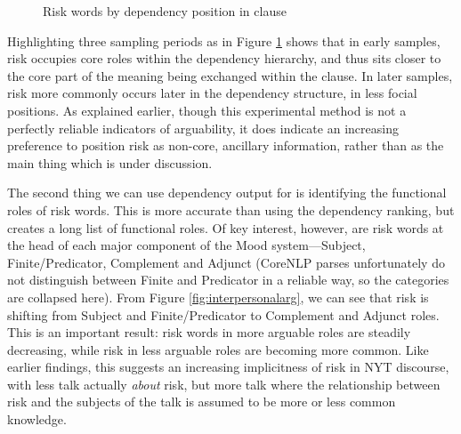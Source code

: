 			\begin{figure}[htb!]
			\centering
			\caption{Risk words by dependency position in clause}
			\label{fig:depnum}
			\end{figure}
			Highlighting three sampling periods as in Figure \ref{fig:depnum} shows that in early samples, risk occupies core roles within the dependency hierarchy, and thus sits closer to the core part of the meaning being exchanged within the clause. In later samples, risk more commonly occurs later in the dependency structure, in less focial positions. As explained earlier, though this experimental method is not a perfectly reliable indicators of arguability, it does indicate an increasing preference to position risk as non-core, ancillary information, rather than as the main thing which is under discussion.


			The second thing we can use dependency output for is identifying the functional roles of risk words. This is more accurate than using the dependency ranking, but creates a long list of functional roles. Of key interest, however, are risk words at the head of each major component of the Mood system---Subject, Finite\slash Predicator, Complement and Adjunct (CoreNLP parses unfortunately do not distinguish between Finite and Predicator in a reliable way, so the categories are collapsed here). From Figure \ref{fig:interpersonalarg}, we can see that risk is shifting from Subject and Finite\slash Predicator to Complement and Adjunct roles. This is an important result: risk words in more arguable roles are steadily decreasing, while risk in less arguable roles are becoming more common. Like earlier findings, this suggests an increasing implicitness of risk in NYT discourse, with less talk actually \emph{about} risk, but more talk where the relationship between risk and the subjects of the talk is assumed to be more or less common knowledge.

